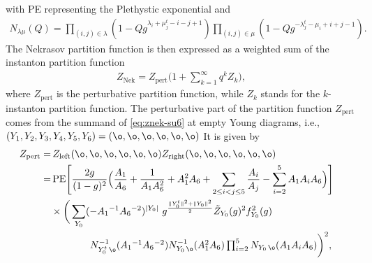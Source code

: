 with PE representing the Plethystic exponential
 and 
\begin{align}
N_{\lambda \mu} (Q) 
= \prod_{(i,j) \in \lambda} \left( 1 - Q g^{\lambda_i + \mu_j^t -i-j+1} \right)
\prod_{(i,j) \in \mu} \left( 1 - Q g^{-\lambda^t_j - \mu_i + i + j - 1} \right). 
\end{align}
The Nekrasov partition function is then expressed as a weighted sum of the instanton partition function %
\begin{align}
Z_{\text{Nek}} = Z_{\text{pert}}\bigg(1 + \sum_{k=1}^{\infty}q^kZ_k\bigg) ,
\end{align}
where $Z_{\text{pert}}$ is the perturbative partition function, while $Z_k$ stands for the $k$-instanton partition function. 
The perturbative part of the partition function $Z_{\text{pert}}$ comes from the summand of \eqref{eq:znek-su6} at empty Young diagrams, i.e., %
$(Y_1, Y_2, Y_3, Y_4, Y_5, Y_6) = (\o,\o,\o,\o,\o,\o)$
It is given by
\begin{align}
Z_{\rm pert} 
=& \,
Z_{\text{left}}(\o,\o,\o,\o,\o,\o)
Z_{\text{right}}(\o,\o,\o,\o,\o,\o)
\cr
=&\, 
\text{PE} \Biggl[ 
\frac{2g}{(1-g)^2} 
\Bigl( \frac{A_1}{A_6} + \frac{1}{A_1A_6^2} + A_1^2  A_6 
+ \sum_{2 \le i <  j \le 5} \frac{A_i}{A_j}
- \sum_{i=2}^5 A_1 A_i  A_6
\Bigr)
\Biggr]
\cr 
& 
\times \bigg(\sum_{Y_0} ( - A_1{}^{-1} A_6{}^{-2})^{|Y_0|} \ 
g^{\frac{\Vert Y_0^t \Vert ^2+\Vert Y_0\Vert ^2}{2}} \tilde{Z}_{Y_0}(g)^2 f_{Y_0}^2(g)
\cr 
& \qquad \qquad
\textstyle N_{Y_0^t \,\o }^{-1} (A_1{}^{-1} A_6{}^{-2})
 N^{-1}_{Y_0 \,\o } (A_1^2  A_6)\prod_{i=2}^5 N_{Y_0 \,\o } (A_1 A_i  A_6)\bigg)^2 ,\label{eq:zpert-top}
\end{align}

